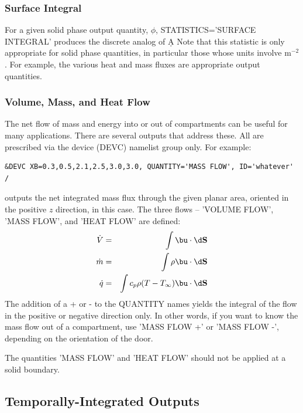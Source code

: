 \documentclass[11pt]{book}
\begin{document}
\subsubsection{Surface Integral}

For a given solid phase output quantity, $\phi$, {\ct STATISTICS='SURFACE INTEGRAL'} produces the discrete analog of
\be \int \phi \; \d A \ee
Note that this statistic is only appropriate for solid phase quantities, in particular those whose units involve m$^{-2}$. For example, the various heat and mass
fluxes are appropriate output quantities.


\subsubsection{Volume, Mass, and Heat Flow}
\label{info:flows}

The net flow of mass and energy into or out of compartments can be useful for many applications. There are several outputs that address these. All are prescribed via
the device ({\ct DEVC}) namelist group only. For example:

\begin{lstlisting}
&DEVC XB=0.3,0.5,2.1,2.5,3.0,3.0, QUANTITY='MASS FLOW', ID='whatever' /
\end{lstlisting}

\noindent
outputs the net integrated mass flux through the given planar area, oriented in the positive $z$ direction, in this case. The three flows -- {\ct 'VOLUME FLOW'}, {\ct 'MASS FLOW'},
and {\ct 'HEAT FLOW'} are defined:
\begin{eqnarray*} \dot{V} &=& \int \bu \cdot \d \mathbf{S}  \\
                  \dot{m} &=& \int \rho \bu \cdot \d \mathbf{S} \\
                  \dot{q} &=& \int c_p \rho (T-T_\infty) \bu \cdot \d \mathbf{S}
\end{eqnarray*}
The addition of a {\ct +} or {\ct -} to the {\ct QUANTITY} names
yields the integral of the flow in the positive or negative direction
only. In other words, if you want to know the mass flow out of a
compartment, use {\ct 'MASS FLOW +'} or {\ct 'MASS FLOW -'}, depending
on the orientation of the door.


The quantities {\ct 'MASS FLOW'} and {\ct 'HEAT FLOW'} should not be applied at a solid boundary.


\subsection{Temporally-Integrated Outputs}
\label{info:time_integral}
\end{document}
